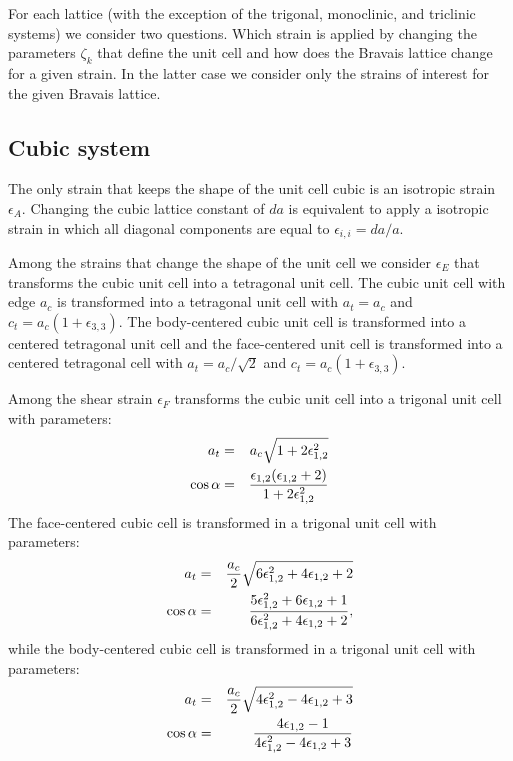 \documentclass[12pt,a4paper]{article}
\begin{document}
For each lattice (with the exception of the trigonal, monoclinic, 
and triclinic systems) we consider two questions. Which strain is applied
by changing the parameters $\zeta_k$ that define the unit cell and 
how does the Bravais lattice change for a given strain. In the latter
case we consider only the strains of interest for the given Bravais 
lattice.

\subsection{\color{web-blue}Cubic system}
The only strain that keeps the shape of the unit cell cubic is an isotropic
strain $\epsilon_A$.
Changing the cubic lattice constant of $da$ is equivalent to apply a
isotropic strain in which all diagonal components are equal to 
$\epsilon_{i,i} = da / a$.

Among the strains that change the shape of the unit cell we consider
$\epsilon_E$ that transforms the cubic unit cell into a tetragonal unit cell.
The cubic unit cell with edge $a_c$ is transformed into a 
tetragonal unit cell with $a_t=a_c$ and $c_t=a_c(1+\epsilon_{3,3})$.
The body-centered cubic unit cell is transformed into
a centered tetragonal unit cell and the face-centered unit cell is
transformed into a centered tetragonal cell with $a_t=a_c / \sqrt{2}$ 
and $c_t=a_c(1+\epsilon_{3,3})$.

Among the shear strain $\epsilon_F$
transforms the cubic unit cell into a trigonal unit cell with
parameters:
\begin{eqnarray}
a_t&=& a_c \sqrt{1+2\epsilon_{1,2}^2} \\
\cos\alpha &=& {\epsilon_{1,2} (\epsilon_{1,2} + 2) \over 
1 + 2 \epsilon_{1,2}^2 }
\end{eqnarray}
The face-centered cubic cell is transformed in a trigonal unit cell 
with parameters:
\begin{eqnarray}
a_t&=& {a_c \over 2} \sqrt{6 \epsilon_{1,2}^2+4 \epsilon_{1,2} +2} \\
\cos\alpha &=& {5\epsilon_{1,2}^2+ 6\epsilon_{1,2} + 1 \over 
6\epsilon_{1,2}^2 + 4\epsilon_{1,2}+2 },
\end{eqnarray}
while the body-centered cubic cell is transformed in a trigonal unit cell
with parameters:
\begin{eqnarray}
a_t&=& {a_c \over 2} \sqrt{ 4\epsilon_{1,2}^2 - 4\epsilon_{1,2} + 3 } \\
\cos\alpha &=& {4\epsilon_{1,2}-1 \over 4\epsilon_{1,2}^2-4\epsilon_{1,2}+3}
\end{eqnarray}
\end{document}

